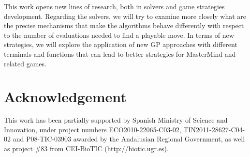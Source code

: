 This work opens new lines of research, both in solvers and game strategies development.
Regarding the solvers, we will try to examine more closely what are
the precise mechanisms that make the algorithms behave differently
with respect to the number of evaluations needed to find a playable
move. In terms of new strategies, we will explore the application of new GP approaches
with different terminals and functions that can lead to better strategies for MasterMind and related games.



 \section*{Acknowledgement}

This work has been partially supported by Spanish Ministry of Science
and Innovation, under project numbers ECO2010-22065-C03-02,
TIN2011-28627-C04-02 and P08-TIC-03903 awarded by the Andalusian
Regional Government, as well as project \#83 from CEI-BioTIC
(http://biotic.ugr.es).


